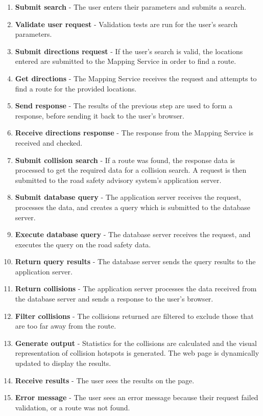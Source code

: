\documentclass[authoryearcitations]{UoYCSproject}
\begin{document}
\begin{enumerate}
	\item \textbf{Submit search} - The user enters their parameters and submits a search.
	\item \textbf{Validate user request} - Validation tests are run for the user's search parameters.
	\item \textbf{Submit directions request} - If the user's search is valid, the locations entered are submitted to the Mapping Service in order to find a route.
	\item \textbf{Get directions} - The Mapping Service receives the request and attempts to find a route for the provided locations.
	\item \textbf{Send response} - The results of the previous step are used to form a response, before sending it back to the user's browser.
	\item \textbf{Receive directions response} - The response from the Mapping Service is received and checked.
	\item \textbf{Submit collision search} - If a route was found, the response data is processed to get the required data for a collision search. A request is then submitted to the road safety advisory system's application server.
	\item \textbf{Submit database query} -  The application server receives the request, processes the data, and creates a query which is submitted to the database server.
	\item \textbf{Execute database query} - The database server receives the request, and executes the query on the road safety data.
	\item \textbf{Return query results} - The database server sends the query results to the application server.
	\item \textbf{Return collisions} - The application server processes the data received from the database server and sends a response to the user's browser.
	\item \textbf{Filter collisions} - The collisions returned are filtered to exclude those that are too far away from the route.
	\item \textbf{Generate output} - Statistics for the collisions are calculated and the visual representation of collision hotspots is generated. The web page is dynamically updated to display the results.
	\item \textbf{Receive results} - The user sees the results on the page.
	\item \textbf{Error message} - The user sees an error message because their request failed validation, or a route was not found.
\end{enumerate}
\end{document}
